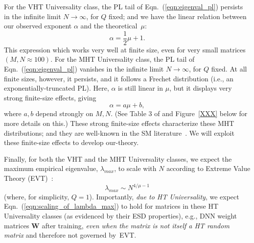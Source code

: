 For the VHT Universality class, the PL tail of Eqn.~(\ref{eqn:eigenval_pl}) persists in the infinite limit $N\rightarrow\infty$, for $Q$ fixed; and
we have the linear relation between our observed exponent $\alpha$ and the theoretical~$\mu$:
\begin{equation}
\alpha=\frac{1}{2}\mu+1  .
\label{eqn:alpha_mu_vht}
\end{equation}
This expression which works very well at finite size, even for very small matrices $(M,N\approx100)$.
%
For the MHT Universality class, the PL tail of Eqn.~(\ref{eqn:eigenval_pl}) vanishes in the infinite limit $N\rightarrow\infty$, for $Q$ fixed.
At all finite sizes, however, it persists, and it follows a Frechet distribution (i.e., an exponentially-truncated PL). 
Here, $\alpha$ is still linear in $\mu$, but it displays very strong finite-size effects, giving 
\begin{equation}
\alpha=a\mu+b, 
\label{eqn:alpha_mu_mht}
\end{equation}
where $a,b$ depend strongly on $M,N$. 
(See Table 3 of \cite{MM18_TR} and Figure~\ref{XXX} below for more details on this.)
These strong finite-size effects characterize these MHT distributions; and they are well-known in the SM literature~\cite{SornetteBook,BouchaudPotters03}. 
We will exploit these finite-size effects to develop our-theory.

Finally, for both the VHT and the MHT Universality classes, we expect the maximum empirical eigenvalue, $\lambda_{max}$, to scale with $N$
according to Extreme Value Theory (EVT)~\cite{heavytails2007,Resnick07,MM18_TR}:
\begin{equation}
\lambda_{max}\sim N^{4/\mu-1}  
\label{eqn:scaling_of_lambda_max}
\end{equation}
(where, for simplicity, $Q=1$).
Importantly, \emph{due to HT Universality}, we expect Eqn.~(\ref{eqn:scaling_of_lambda_max}) to hold for matrices in these HT Universality classes (as evidenced by their ESD properties), e.g., DNN weight matrices $\mathbf{W}$ after training, \emph{even when the matrix is not itself a HT random matrix} and therefore not governed by~EVT.



